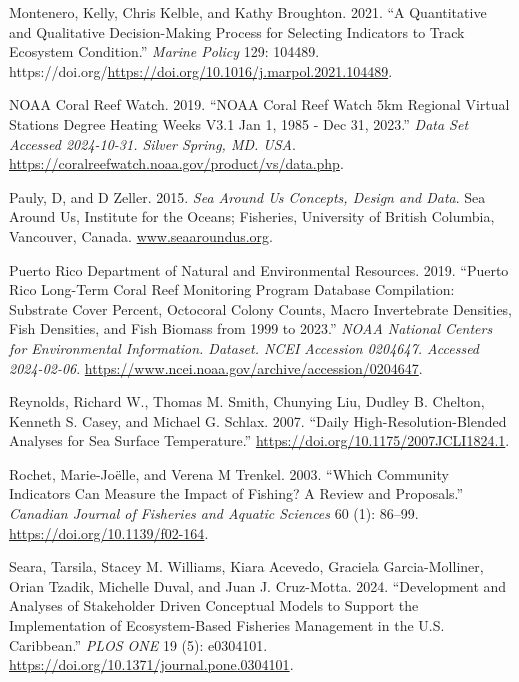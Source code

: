 \documentclass[
  letterpaper,
  oneside,
  open=any]{scrbook}
\newlength{\cslhangindent}
\newenvironment{CSLReferences}[2] %
 {\begin{list}{}{%
  \setlength{\itemindent}{0pt}
  \setlength{\leftmargin}{0pt}
  \setlength{\parsep}{0pt}
  \ifodd #1
   \setlength{\leftmargin}{\cslhangindent}
   \setlength{\itemindent}{-1\cslhangindent}
  \fi
  \setlength{\itemsep}{#2\baselineskip}}}
 {\end{list}}
\begin{document}
\begin{CSLReferences}{1}{0}
Montenero, Kelly, Chris Kelble, and Kathy Broughton. 2021. {``A
Quantitative and Qualitative Decision-Making Process for Selecting
Indicators to Track Ecosystem Condition.''} \emph{Marine Policy} 129:
104489.
https://doi.org/\url{https://doi.org/10.1016/j.marpol.2021.104489}.

NOAA Coral Reef Watch. 2019. {``NOAA Coral Reef Watch 5km Regional
Virtual Stations Degree Heating Weeks V3.1 Jan 1, 1985 - Dec 31,
2023.''} \emph{Data Set Accessed 2024-10-31. Silver Spring, MD. USA}.
\url{https://coralreefwatch.noaa.gov/product/vs/data.php}.

Pauly, D, and D Zeller. 2015. \emph{Sea Around Us Concepts, Design and
Data}. Sea Around Us, Institute for the Oceans; Fisheries, University of
British Columbia, Vancouver, Canada.
\href{https://www.seaaroundus.org}{www.seaaroundus.org}.

Puerto Rico Department of Natural and Environmental Resources. 2019.
{``Puerto Rico Long-Term Coral Reef Monitoring Program Database
Compilation: Substrate Cover Percent, Octocoral Colony Counts, Macro
Invertebrate Densities, Fish Densities, and Fish Biomass from 1999 to
2023.''} \emph{NOAA National Centers for Environmental Information.
Dataset. NCEI Accession 0204647. Accessed 2024-02-06}.
\url{https://www.ncei.noaa.gov/archive/accession/0204647}.

Reynolds, Richard W., Thomas M. Smith, Chunying Liu, Dudley B. Chelton,
Kenneth S. Casey, and Michael G. Schlax. 2007. {``Daily
High-Resolution-Blended Analyses for Sea Surface Temperature.''}
\url{https://doi.org/10.1175/2007JCLI1824.1}.

Rochet, Marie-Joëlle, and Verena M Trenkel. 2003. {``Which Community
Indicators Can Measure the Impact of Fishing? A Review and Proposals.''}
\emph{Canadian Journal of Fisheries and Aquatic Sciences} 60 (1):
86--99. \url{https://doi.org/10.1139/f02-164}.

Seara, Tarsila, Stacey M. Williams, Kiara Acevedo, Graciela
Garcia-Molliner, Orian Tzadik, Michelle Duval, and Juan J. Cruz-Motta.
2024. {``Development and Analyses of Stakeholder Driven Conceptual
Models to Support the Implementation of Ecosystem-Based Fisheries
Management in the U.S. Caribbean.''} \emph{PLOS ONE} 19 (5): e0304101.
\url{https://doi.org/10.1371/journal.pone.0304101}.


\end{CSLReferences}
\end{document}
